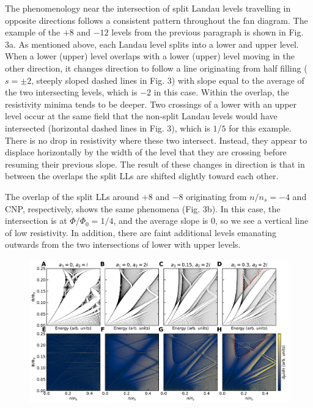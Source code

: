 \documentclass[12pt,twocolumn]{article}
\begin{document}
The phenomenology near the intersection of split Landau levels travelling in opposite directions follows a consistent pattern throughout the fan diagram. The example of the $+8$ and $-12$ levels from the previous paragraph is shown in Fig. 3a. As mentioned above, each Landau level splits into a lower and upper level. When a lower (upper) level overlaps with a lower (upper) level moving in the other direction, it changes direction to follow a line originating from half filling ($s = \pm 2$, steeply sloped dashed lines in Fig. 3) with slope equal to the average of the two intersecting levels, which is $-2$ in this case. Within the overlap, the resistivity minima tends to be deeper. Two crossings of a lower with an upper level occur at the same field that the non-split Landau levels would have intersected (horizontal dashed lines in Fig. 3), which is $1/5$ for this example. There is no drop in resistivity where these two intersect. Instead, they appear to displace horizontally by the width of the level that they are crossing before resuming their previous slope. The result of these changes in direction is that in between the overlaps the split LLs are shifted slightly toward each other.

The overlap of the split LLs around $+8$ and $-8$ originating from $n/n_s = -4$ and CNP, respectively, shows the same phenomena (Fig. 3b). In this case, the intersection is at $\Phi/\Phi_0 = 1/4$, and the average slope is $0$, so we see a vertical line of low resistivity. In addition, there are faint additional levels emanating outwards from the two intersections of lower with upper levels.

\begin{figure}[t!]
\includegraphics[width=\textwidth]{fig4.pdf}
\end{figure}
\end{document}
